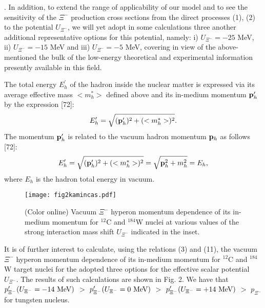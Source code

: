 \documentclass[12pt]{article}
\begin{document}
.
In addition, to extend the range of applicability of our model and to see the sensitivity of the $\Xi^-$ production cross sections from the direct processes (1), (2) to the potential $U_{\Xi^-}$, we will yet adopt in
some calculations three another additional representative options for this potential, namely: i) $U_{\Xi^-}=-25$ MeV,
ii) $U_{\Xi^-}=-15$ MeV and iii) $U_{\Xi^-}=-5$ MeV, covering in view of the above-mentioned 
the bulk of the low-energy theoretical and experimental information presently available in this field.

      The total energy $E^\prime_{h}$ of the hadron inside the nuclear matter is
expressed via its average effective mass $<m^*_{h}>$ defined above and its in-medium momentum
${\bf p}^{\prime}_{h}$ by the expression [72]:
\begin{equation}
E^\prime_{h}=\sqrt{({\bf p}^{\prime}_{h})^2+(<m^*_{h}>)^2}.
\end{equation}
The momentum ${\bf p}^{\prime}_{h}$ is related to the vacuum hadron momentum ${\bf p}_{h}$
as follows [72]:
\begin{equation}
E^\prime_{h}=\sqrt{({\bf p}^{\prime}_{h})^2+(<m^*_{h}>)^2}=
\sqrt{{\bf p}^2_{h}+m^2_{h}}=E_{h},
\end{equation}
where $E_{h}$ is the hadron total energy in vacuum.
\begin{figure}[htb]
\begin{center}
\texttt{[image: fig2kamincas.pdf]}
\vspace*{-2mm} \caption{(Color online) Vacuum $\Xi^-$ hyperon momentum dependence of its in-medium
momentum for $^{12}$C and $^{184}$W nuclei at various values of the strong interaction mass shift $U_{\Xi^-}$
indicated in the inset.}
\label{void}
\end{center}
\end{figure}
It is of further interest to calculate, using the relations (3) and (11), the vacuum $\Xi^-$ hyperon
momentum dependence of its in-medium momentum for $^{12}$C and $^{184}$W target nuclei for the adopted
three options for the effective scalar potential $U_{\Xi^-}$. The results of such calculations are shown
in Fig. 2. We have that $p^{\prime}_{\Xi^-}(U_{\Xi^-}=-14~{\rm MeV})$ $>$ $p^{\prime}_{\Xi^-}(U_{\Xi^-}=0~{\rm MeV})$
$>$ $p^{\prime}_{\Xi^-}(U_{\Xi^-}=+14~{\rm MeV})$ $>$ $p_{\Xi^-}$ for tungsten nucleus.
\end{document}
